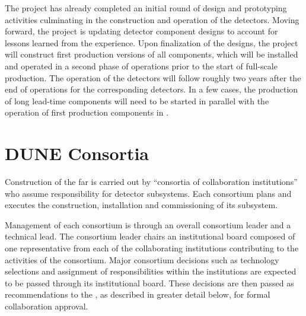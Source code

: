 The  project has already completed an initial round of design 
and prototyping activities culminating in the construction and operation 
of the  detectors.  Moving forward, the project is 
updating detector component designs to account for lessons learned from 
the  experience.  Upon finalization of the designs, the 
project will construct first production versions of all components, which 
will be installed and operated in a second phase of  
operations prior to the start of full-scale production.  The operation 
of the  detectors will follow roughly two years after
the end of operations for the corresponding  detectors.
In a few cases, the production of long lead-time components will need to 
be started in parallel with the operation of first production components 
in .

\section{DUNE Consortia}
\label{sec:consortia}

Construction of the  far  is carried out by 
``consortia of collaboration institutions'' who assume responsibility for 
detector subsystems.  Each consortium plans and executes the construction, 
installation and commissioning of its subsystem.

Management of each consortium is through an overall consortium leader and  %
a technical lead.  The consortium leader chairs an institutional board 
composed of one representative from each of the collaborating institutions   %
contributing to the activities of the consortium.  Major consortium decisions 
such as technology selections and assignment of responsibilities within 
the institutions are expected to be passed through its institutional board.  
These decisions are then passed as recommendations to the  
, as described in greater detail below, for formal collaboration 
approval.

